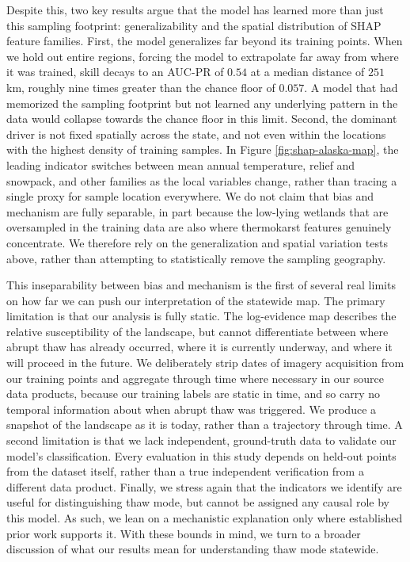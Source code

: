 \documentclass[../main.tex]{subfiles}
\begin{document}
Despite this, two key results argue that the model has learned more than just this sampling footprint: generalizability and the spatial distribution of SHAP feature families. First, the model generalizes far beyond its training points. When we hold out entire regions, forcing the model to extrapolate far away from where it was trained, skill decays to an AUC-PR of $0.54$ at a median distance of $251$ km, roughly nine times greater than the chance floor of $0.057$. A model that had memorized the sampling footprint but not learned any underlying pattern in the data would collapse towards the chance floor in this limit. Second, the dominant driver is not fixed spatially across the state, and not even within the locations with the highest density of training samples. In Figure \ref{fig:shap-alaska-map}, the leading indicator switches between mean annual temperature, relief and snowpack, and other families as the local variables change, rather than tracing a single proxy for sample location everywhere. We do not claim that bias and mechanism are fully separable, in part because the low-lying wetlands that are oversampled in the training data are also where thermokarst features genuinely concentrate. We therefore rely on the generalization and spatial variation tests above, rather than attempting to statistically remove the sampling geography.

This inseparability between bias and mechanism is the first of several real limits on how far we can push our interpretation of the statewide map. The primary limitation is that our analysis is fully static. The log-evidence map describes the relative susceptibility of the landscape, but cannot differentiate between where abrupt thaw has already occurred, where it is currently underway, and where it will proceed in the future. We deliberately strip dates of imagery acquisition from our training points and aggregate through time where necessary in our source data products, because our training labels are static in time, and so carry no temporal information about when abrupt thaw was triggered. We produce a snapshot of the landscape as it is today, rather than a trajectory through time. A second limitation is that we lack independent, ground-truth data to validate our model's classification. Every evaluation in this study depends on held-out points from the dataset itself, rather than a true independent verification from a different data product. Finally, we stress again that the indicators we identify are useful for distinguishing thaw mode, but cannot be assigned any causal role by this model. As such, we lean on a mechanistic explanation only where established prior work supports it. With these bounds in mind, we turn to a broader discussion of what our results mean for understanding thaw mode statewide.
\end{document}
